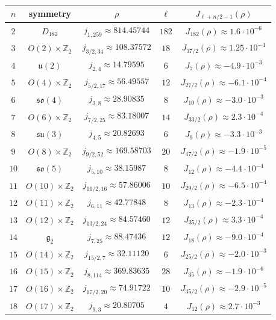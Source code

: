 \documentclass[11pt]{amsart}
\theoremstyle{definition}
\theoremstyle{remark}
\numberwithin{equation}{section}
\newcommand{\Z}{\mathbb{Z}}
\begin{document}
\begin{table}[ht]
\centering
\begin{tabular}{@{}ccccc@{}}
\toprule
$n$ & symmetry & $\rho$ & $\ell$ & $J_{\ell+n/2-1}(\rho)$\\
\midrule
$2$ & $D_{182}$ & $j_{1,259}\approx814.45744$ & $182$ & $J_{182}(\rho)\approx1.6\cdot10^{-6}$\\
$3$ & $O(2)\times\Z_2$ & $j_{3/2,34}\approx108.37572$ & $18$ & $J_{37/2}(\rho)\approx1.25\cdot10^{-4}$\\
$4$ & $\mathfrak u(2)$ & $j_{2,4}\approx14.79595$ & $6$ & $J_{7}(\rho)\approx-4.9\cdot10^{-3}$\\
$5$ & $O(4)\times\Z_2$ & $j_{5/2,17}\approx56.49557$ & $12$ & $J_{27/2}(\rho)\approx-6.1\cdot10^{-4}$\\
$6$ & $\mathfrak{so}(4)$ & $j_{3,8}\approx28.90835$ & $8$ & $J_{10}(\rho)\approx-3.0\cdot10^{-3}$\\
$7$ & $O(6)\times\Z_2$ & $j_{7/2,25}\approx83.18007$ & $14$ & $J_{33/2}(\rho)\approx2.3\cdot10^{-4}$\\
$8$ & $\mathfrak{su}(3)$ & $j_{4,5}\approx20.82693$ & $6$ & $J_{9}(\rho)\approx-3.3\cdot10^{-3}$\\
$9$ & $O(8)\times\Z_2$ & $j_{9/2,52}\approx169.58703$ & $20$ & $J_{47/2}(\rho)\approx-1.9\cdot10^{-5}$\\
$10$ & $\mathfrak{so}(5)$ & $j_{5,10}\approx38.15987$ & $8$ & $J_{12}(\rho)\approx-4.4\cdot10^{-4}$\\
$11$ & $O(10)\times\Z_2$ & $j_{11/2,16}\approx57.86006$ & $10$ & $J_{29/2}(\rho)\approx-6.5\cdot10^{-4}$\\
$12$ & $O(11)\times\Z_2$ & $j_{6,11}\approx42.77848$ & $8$ & $J_{13}(\rho)\approx-2.3\cdot10^{-4}$\\
$13$ & $O(12)\times\Z_2$ & $j_{13/2,24}\approx84.57460$ & $12$ & $J_{35/2}(\rho)\approx3.3\cdot10^{-4}$\\
$14$ & $\mathfrak g_2$ & $j_{7,25}\approx88.47436$ & $12$ & $J_{18}(\rho)\approx-9.0\cdot10^{-4}$\\
$15$ & $O(14)\times\Z_2$ & $j_{15/2,7}\approx32.11120$ & $6$ & $J_{25/2}(\rho)\approx-2.0\cdot10^{-3}$\\
$16$ & $O(15)\times\Z_2$ & $j_{8,114}\approx369.83635$ & $28$ & $J_{35}(\rho)\approx-1.9\cdot10^{-6}$\\
$17$ & $O(16)\times\Z_2$ & $j_{17/2,20}\approx74.91722$ & $10$ & $J_{35/2}(\rho)\approx-2.9\cdot10^{-5}$\\
$18$ & $O(17)\times\Z_2$ & $j_{9,3}\approx20.80705$ & $4$ & $J_{12}(\rho)\approx2.7\cdot10^{-3}$\\

\end{tabular}
\end{table}
\end{document}
